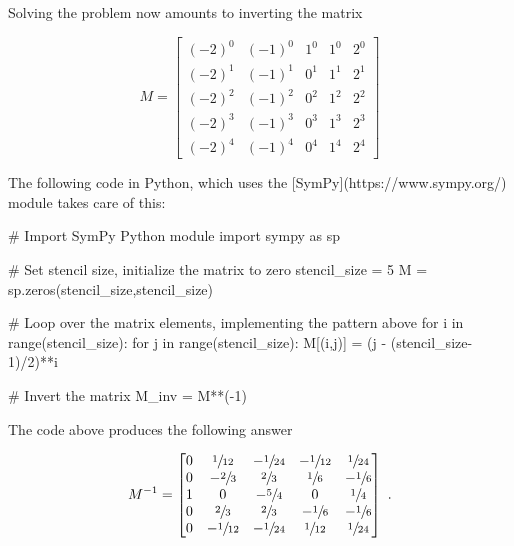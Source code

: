 \documentclass[a4paper,11pt]{article}
\begin{document}
Solving the problem now amounts to inverting the matrix

\begin{equation}
M =
\begin{bmatrix}
(-2)^{0} & (-1)^{0} & 1^{0} & 1^{0} & 2^{0}\\
(-2)^{1} & (-1)^{1} & 0^{1} & 1^{1} & 2^{1}\\
(-2)^{2} & (-1)^{2} & 0^{2} & 1^{2} & 2^{2}\\
(-2)^{3} & (-1)^{3} & 0^{3} & 1^{3} & 2^{3}\\
(-2)^{4} & (-1)^{4} & 0^{4} & 1^{4} & 2^{4}
\end{bmatrix}
\end{equation}

The following code in Python, which uses the [SymPy](https://www.sympy.org/) module takes care of this:

\begin{center}
\begin{minipage}[c]{0.95\textwidth}
\begin{python}
# Import SymPy Python module
import sympy as sp

# Set stencil size, initialize the matrix to zero
stencil_size = 5
M = sp.zeros(stencil_size,stencil_size)

# Loop over the matrix elements, implementing the pattern above
for i in range(stencil_size):
    for j in range(stencil_size):
        M[(i,j)] = (j - (stencil_size-1)/2)**i

# Invert the matrix
M_inv = M**(-1)
\end{python}
\end{minipage}
\end{center}

The code above produces the following answer

\begin{equation}
M^{-1} =
\begin{bmatrix}
0 & \sfrac{1}{12}  & -\sfrac{1}{24} & -\sfrac{1}{12} & \sfrac{1}{24} \\
0 & -\sfrac{2}{3}  & \sfrac{2}{3}   & \sfrac{1}{6}   & -\sfrac{1}{6} \\
1 & 0             & -\sfrac{5}{4}  & 0             & \sfrac{1}{4}  \\
0 & \sfrac{2}{3}   & \sfrac{2}{3}   & -\sfrac{1}{6}  & -\sfrac{1}{6} \\
0 & -\sfrac{1}{12} & -\sfrac{1}{24} & \sfrac{1}{12}  & \sfrac{1}{24}
\end{bmatrix}\ .
\end{equation}
\end{document}
